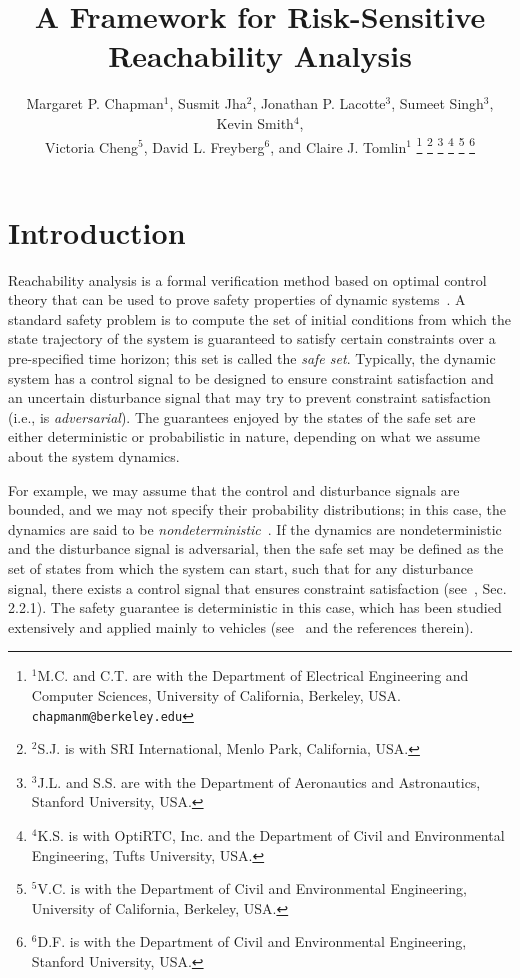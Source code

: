 \documentclass[letterpaper, 10 pt, conference]{ieeeconf}  %
\title{\LARGE \bf
A Framework for Risk-Sensitive Reachability Analysis}
\author{Margaret P. Chapman$^{1}$, Susmit Jha$^{2}$, Jonathan P. Lacotte$^{3}$, Sumeet Singh$^{3}$, Kevin Smith$^{4}$, \\
Victoria Cheng$^{5}$, David L. Freyberg$^{6}$, and Claire J. Tomlin$^{1}$%
\thanks{$^{1}$M.C. and C.T. are with the Department of Electrical Engineering and Computer Sciences, University of California, Berkeley, USA.
        {\tt\small chapmanm@berkeley.edu}}%
\thanks{$^{2}$S.J. is with SRI International, Menlo Park, California, USA. 
        }%
\thanks{$^{3}$J.L. and S.S. are with the Department of Aeronautics and Astronautics, Stanford University, USA.
        }%
\thanks{$^{4}$K.S. is with OptiRTC, Inc. and the Department of Civil and Environmental Engineering, Tufts University, USA.
        }%
\thanks{$^{5}$V.C. is with the Department of Civil and Environmental Engineering, University of California, Berkeley, USA.
        }%
\thanks{$^{6}$D.F. is with the Department of Civil and Environmental Engineering, Stanford University, USA.
		}%
}
\begin{document}
\maketitle
\thispagestyle{empty}
\pagestyle{empty}

\begin{abstract}
\end{abstract}
\section{Introduction}
Reachability analysis is a formal verification method based on optimal control theory that can be used to prove 
safety properties of dynamic systems~\cite{bansal2017hamilton}.\footnotemark
{}
A standard safety problem is to compute the set of initial conditions from which the state trajectory of the system 
is guaranteed to satisfy certain constraints over a pre-specified time horizon; this set is called the \textit{safe set}.
Typically, the dynamic system has a control signal to be designed to ensure constraint satisfaction 
and an uncertain disturbance signal that may try to prevent constraint satisfaction (i.e., is \textit{adversarial}). 
The guarantees enjoyed by the states of the safe set are either deterministic or probabilistic in nature, 
depending on what we assume about the system dynamics.

For example, we may assume that the control and disturbance signals are bounded, 
and we may not specify their probability distributions; in this case,
the dynamics are said to be \textit{nondeterministic}~\cite{mitchell2005toolbox}.
If the dynamics are nondeterministic and the disturbance signal is adversarial, then the safe set may be defined as the set of states from which the system can 
start, such that for any disturbance signal,
there exists a control signal that ensures constraint satisfaction (see~\cite{EECS-2018-41}, Sec. 2.2.1).
The safety guarantee is deterministic in this case, which has been studied extensively and applied mainly to vehicles (see~\cite{bansal2017hamilton} and the references therein). 
\end{document}
